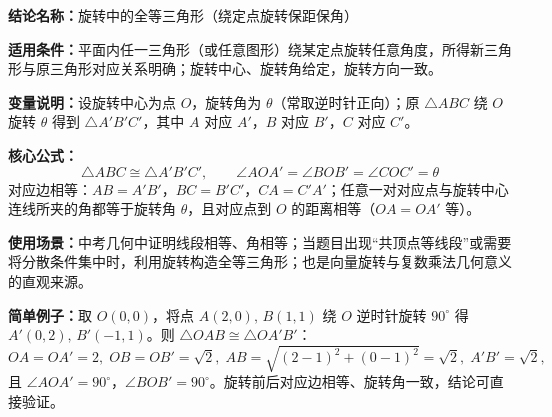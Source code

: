\textbf{结论名称：}旋转中的全等三角形（绕定点旋转保距保角）

\textbf{适用条件：}平面内任一三角形（或任意图形）绕某定点旋转任意角度，所得新三角形与原三角形对应关系明确；旋转中心、旋转角给定，旋转方向一致。

\textbf{变量说明：}设旋转中心为点 \(O\)，旋转角为 \(\theta\)（常取逆时针正向）；原 \(\triangle ABC\) 绕 \(O\) 旋转 \(\theta\) 得到 \(\triangle A'B'C'\)，其中 \(A\) 对应 \(A'\)，\(B\) 对应 \(B'\)，\(C\) 对应 \(C'\)。

\textbf{核心公式：}
\[
\boxed{\triangle ABC \cong \triangle A'B'C'},\qquad 
\boxed{\angle AOA' = \angle BOB' = \angle COC' = \theta}
\]
对应边相等：\(AB=A'B'\)，\(BC=B'C'\)，\(CA=C'A'\)；任意一对对应点与旋转中心连线所夹的角都等于旋转角 \(\theta\)，且对应点到 \(O\) 的距离相等（\(OA=OA'\) 等）。

\textbf{使用场景：}中考几何中证明线段相等、角相等；当题目出现“共顶点等线段”或需要将分散条件集中时，利用旋转构造全等三角形；也是向量旋转与复数乘法几何意义的直观来源。

\textbf{简单例子：}取 \(O(0,0)\)，将点 \(A(2,0),\,B(1,1)\) 绕 \(O\) 逆时针旋转 \(90^\circ\) 得 \(A'(0,2),\,B'(-1,1)\)。则 \(\triangle OAB\cong\triangle OA'B'\)：
\[
OA=OA'=2,\; OB=OB'=\sqrt{2},\; AB=\sqrt{(2-1)^2+(0-1)^2}=\sqrt{2},\; A'B'=\sqrt{2},
\]
且 \(\angle AOA' = 90^\circ\)，\(\angle BOB' = 90^\circ\)。旋转前后对应边相等、旋转角一致，结论可直接验证。
